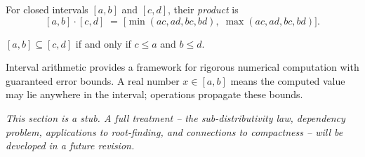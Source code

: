\begin{tcolorbox}[colback=propbox, colframe=propborder, arc=2pt,
  left=6pt, right=6pt, top=4pt, bottom=4pt,
  title={\small\textbf{Definition (Interval Multiplication)}},
  fonttitle=\small\bfseries]
\label{def:interval-mult}
For closed intervals $[a,b]$ and $[c,d]$, their \emph{product} is
\[
  [a,b] \cdot [c,d] \;=\;
  \bigl[\min(ac, ad, bc, bd),\; \max(ac, ad, bc, bd)\bigr].
\]
\end{tcolorbox}

\begin{tcolorbox}[colback=propbox, colframe=propborder, arc=2pt,
  left=6pt, right=6pt, top=4pt, bottom=4pt,
  title={\small\textbf{Definition (Interval Containment)}},
  fonttitle=\small\bfseries]
\label{def:interval-contain}
$[a,b] \subseteq [c,d]$ if and only if $c \leq a$ and $b \leq d$.
\end{tcolorbox}

\begin{remark}[Motivation]
Interval arithmetic provides a framework for rigorous numerical computation
with guaranteed error bounds. A real number $x \in [a,b]$ means the computed
value may lie anywhere in the interval; operations propagate these bounds.
\end{remark}

\begin{remark}[Status]
\textit{This section is a stub. A full treatment -- the sub-distributivity law,
dependency problem, applications to root-finding, and connections to
compactness -- will be developed in a future revision.}
\end{remark}
